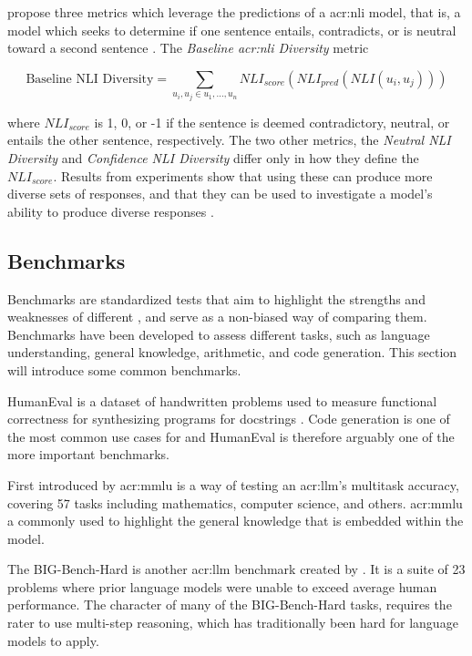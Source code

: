 \cite{stasaskiSemanticDiversityDialogue2022} propose three metrics which leverage the predictions of a \gls{acr:nli} model, that is, a model which seeks to determine if one sentence entails, contradicts, or is neutral toward a second  sentence \citep[1]{stasaskiSemanticDiversityDialogue2022}. The \textit{Baseline \acrshort{acr:nli} Diversity} metric

\begin{equation}
    \text{Baseline NLI Diversity} = \sum_{u_i,u_j \in u_1,...,u_n} NLI_{score}(NLI_{pred}(NLI(u_i, u_j)))
\end{equation}

where $NLI_{score}$ is 1, 0, or -1 if the sentence is deemed contradictory, neutral, or entails the other sentence, respectively. The two other metrics, the \textit{Neutral NLI Diversity} and \textit{Confidence NLI Diversity} differ only in how they define the $NLI_{score}$. Results from experiments show that using these can produce more diverse sets of responses, and that they can be used to investigate a model's ability to produce diverse responses \citep[9]{stasaskiSemanticDiversityDialogue2022}.

\subsection{Benchmarks}\label{subsec:benchmarks}

Benchmarks are standardized tests that aim to highlight the strengths and weaknesses of different , and serve as a non-biased way of comparing them. Benchmarks have been developed to assess different tasks, such as language understanding, general knowledge, arithmetic, and code generation. This section will introduce some common benchmarks.

HumanEval is a dataset of handwritten problems used to measure functional correctness for synthesizing programs for docstrings \citep[2-4]{chenEvaluatingLargeLanguage2021}. Code generation is one of the most common use cases for  and HumanEval is therefore arguably one of the more important benchmarks.

First introduced by \cite{hendrycksMeasuringMassiveMultitask2021} \gls{acr:mmlu} is a way of testing an \acrlong{acr:llm}'s multitask accuracy, covering 57 tasks including mathematics, computer science, and others. \gls{acr:mmlu} a commonly used to highlight the general knowledge that is embedded within the model.

The BIG-Bench-Hard is another \acrshort{acr:llm} benchmark created by \cite{suzgunChallengingBIGBenchTasks2022}. It is a suite of 23 problems where prior language models were unable to exceed average human performance. The character of many of the BIG-Bench-Hard tasks, requires the rater to use multi-step reasoning, which has traditionally been hard for language models to apply.

